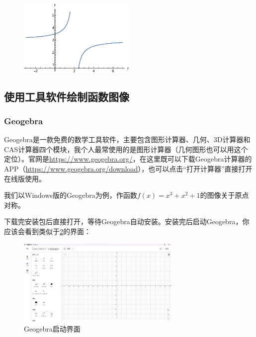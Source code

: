 \documentclass[lang=cn,math=cm,chinesefont=nofont,11pt,scheme=chinese,onecol]{elegantbook}
\begin{document}
\begin{figure}[h]
  \centering
  \includegraphics[width=0.5\textwidth]{image/2.1.5function4.eps}
  \label{img:2.1.5function4}
\end{figure}

\subsection{使用工具软件绘制函数图像}

\subsubsection{Geogebra}

Geogebra是一款免费的数学工具软件，主要包含图形计算器、几何、3D计算器和CAS计算器四个模块，我个人最常使用的是图形计算器（几何图形也可以用这个定位）。官网是\href{https://www.geogebra.org/}{https://www.geogebra.org/}，在这里既可以下载Geogebra计算器的APP（\href{https://www.geogebra.org/download}{https://www.geogebra.org/download}），也可以点击“打开计算器”直接打开在线版使用。

我们以Windows版的Geogebra为例，作函数$f(x)=x^3+x^2+1$的图像关于原点对称。

下载完安装包后直接打开，等待Geogebra自动安装。安装完后启动Geogebra，你应该会看到类似于\ref{img:geogebra1}的界面：

\begin{figure}[h]
  \centering
  \includegraphics[width=0.7\textwidth]{image/geogebra1.png}
  \caption{Geogebra启动界面}
  \label{img:geogebra1}
\end{figure}
\end{document}
